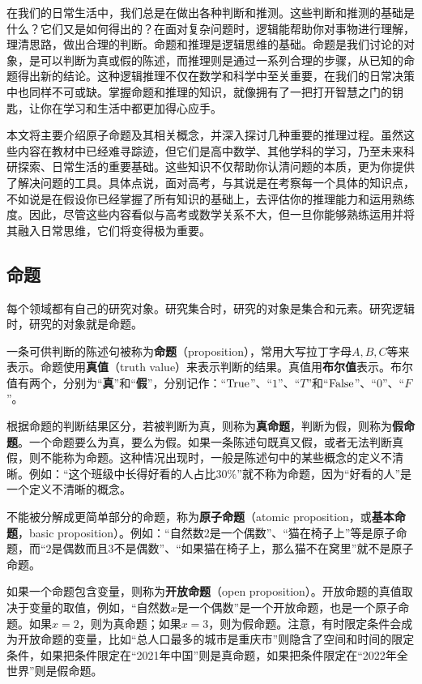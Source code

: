 

在我们的日常生活中，我们总是在做出各种判断和推测。这些判断和推测的基础是什么？它们又是如何得出的？在面对复杂问题时，逻辑能帮助你对事物进行理解，理清思路，做出合理的判断。命题和推理是逻辑思维的基础。命题是我们讨论的对象，是可以判断为真或假的陈述，而推理则是通过一系列合理的步骤，从已知的命题得出新的结论。这种逻辑推理不仅在数学和科学中至关重要，在我们的日常决策中也同样不可或缺。掌握命题和推理的知识，就像拥有了一把打开智慧之门的钥匙，让你在学习和生活中都更加得心应手。

本文将主要介绍原子命题及其相关概念，并深入探讨几种重要的推理过程。虽然这些内容在教材中已经难寻踪迹，但它们是高中数学、其他学科的学习，乃至未来科研探索、日常生活的重要基础。这些知识不仅帮助你认清问题的本质，更为你提供了解决问题的工具。具体点说，面对高考，与其说是在考察每一个具体的知识点，不如说是在假设你已经掌握了所有知识的基础上，去评估你的推理能力和运用熟练度。因此，尽管这些内容看似与高考或数学关系不大，但一旦你能够熟练运用并将其融入日常思维，它们将变得极为重要。

\subsection{命题}

每个领域都有自己的研究对象。研究集合时，研究的对象是集合和元素。研究逻辑时，研究的对象就是命题。

一条可供判断的陈述句被称为\textbf{命题}（proposition），常用大写拉丁字母$A,B,C$等来表示。命题使用\textbf{真值}（truth value）来表示判断的结果。真值用\textbf{布尔值}表示。布尔值有两个，分别为“\textbf{真}”和“\textbf{假}”，分别记作：“${\rm True}$”、“$1$”、“$T$”和“${\rm False}$”、“$0$”、“$F$”。

根据命题的判断结果区分，若被判断为真，则称为\textbf{真命题}，判断为假，则称为\textbf{假命题}。一个命题要么为真，要么为假。如果一条陈述句既真又假，或者无法判断真假，则不能称为命题。这种情况出现时，一般是陈述句中的某些概念的定义不清晰。例如：“这个班级中长得好看的人占比$30\%$”就不称为命题，因为“好看的人”是一个定义不清晰的概念。

不能被分解成更简单部分的命题，称为\textbf{原子命题}（atomic proposition，或\textbf{基本命题}，basic proposition）。例如：“自然数2是一个偶数”、“猫在椅子上”等是原子命题，而“2是偶数而且3不是偶数”、“如果猫在椅子上，那么猫不在窝里”就不是原子命题。

如果一个命题包含变量，则称为\textbf{开放命题}（open proposition）。开放命题的真值取决于变量的取值，例如，“自然数$x$是一个偶数”是一个开放命题，也是一个原子命题。如果$x=2$，则为真命题；如果$x=3$，则为假命题。注意，有时限定条件会成为开放命题的变量，比如“总人口最多的城市是重庆市”则隐含了空间和时间的限定条件，如果把条件限定在“2021年中国”则是真命题，如果把条件限定在“2022年全世界”则是假命题。

